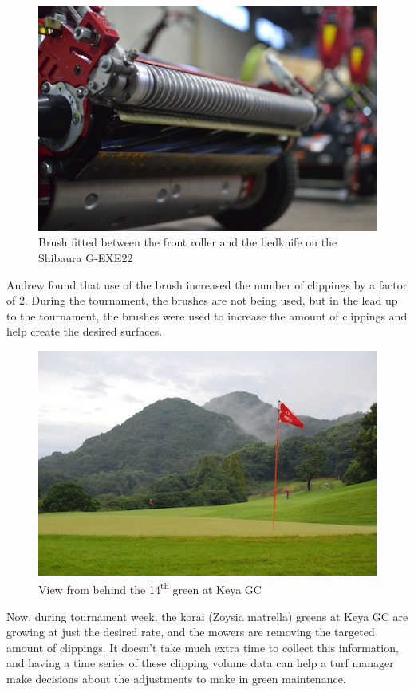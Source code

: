 \documentclass[12pt,b5,]{tufte-book}
\begin{document}
\begin{figure}
\centering
\includegraphics{img/b2-4.png}
\caption{Brush fitted between the front roller and the bedknife on the Shibaura G-EXE22}
\end{figure}

Andrew found that use of the brush increased the number of clippings by a factor of 2. During the tournament, the brushes are not being used, but in the lead up to the tournament, the brushes were used to increase the amount of clippings and help create the desired surfaces.

\begin{figure}
\centering
\includegraphics{img/b2-5.png}
\caption{View from behind the 14\textsuperscript{th} green at Keya GC}
\end{figure}

Now, during tournament week, the korai (Zoysia matrella) greens at Keya GC are growing at just the desired rate, and the mowers are removing the targeted amount of clippings. It doesn't take much extra time to collect this information, and having a time series of these clipping volume data can help a turf manager make decisions about the adjustments to make in green maintenance.
\end{document}
